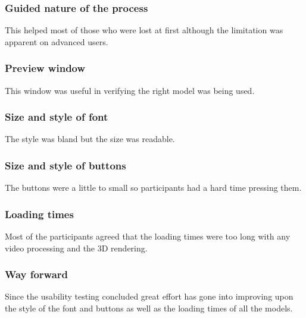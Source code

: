 \subsubsection{Guided nature of the process}
This helped most of those who were lost at first although the limitation was apparent on advanced users.

\subsubsection{Preview window}
This window was useful in verifying the right model was being used.

\subsubsection{Size and style of font}
The style was bland but the size was readable.

\subsubsection{Size and style of buttons}
The buttons were a little to small so participants had a hard time pressing them.

\subsubsection{Loading times}
Most of the participants agreed that the loading times were too long with any video processing and the 3D rendering.

\subsubsection{Way forward}
Since the usability testing concluded great effort has gone into improving upon the style of the font and buttons as well as the loading times of all the models.
